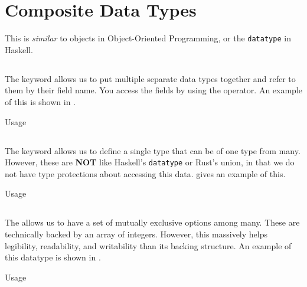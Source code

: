 \section{Composite Data Types}\label{sec:Composite_Data_Types}
This is \textit{similar} to objects in Object-Oriented Programming, or the \texttt{datatype} in Haskell.

\subsection{\texorpdfstring{}{\texttt{struct}}}\label{subsec:struct}
The  keyword allows us to put multiple separate data types together and refer to them by their field name.
You access the fields by using the  operator.
An example of this is shown in .

\begin{listing}[h!tbp]
\caption{\texorpdfstring{}{\texttt{struct}} Usage}
\label{lst:struct_Usage}
\end{listing}

\subsection{\texorpdfstring{}{\texttt{union}}}\label{subsec:union}
The  keyword allows us to define a single type that can be of one type from many.
However, these are \textbf{NOT} like Haskell's \texttt{datatype} or Rust's union, in that we do not have type protections about accessing this data.
 gives an example of this.

\begin{listing}[h!tbp]
\caption{\texorpdfstring{}{\texttt{union}} Usage}
\label{lst:union_Usage}
\end{listing}

\subsection{\texorpdfstring{}{\texttt{enum}}}\label{subsec:enum}
The  allows us to have a set of mutually exclusive options among many.
These are technically backed by an array of integers.
However, this massively helps legibility, readability, and writability than its backing structure.
An example of this datatype is shown in .

\begin{listing}[h!tbp]
\caption{\texorpdfstring{}{\texttt{enum}} Usage}
\label{lst:enum_Usage}
\end{listing}


